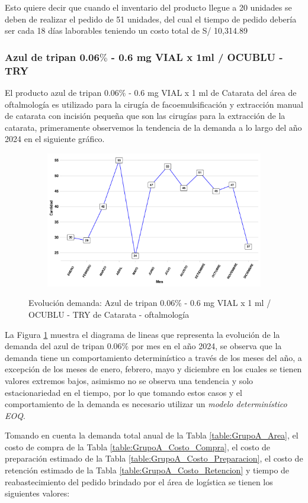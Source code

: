 Esto quiere decir que cuando el inventario del producto llegue a 20 unidades se deben de realizar el pedido de 51 unidades, del cual el tiempo de pedido debería ser cada 18 días laborables teniendo un costo total de S/ 10,314.89
\subsubsection{Azul de tripan 0.06$\%$ - 0.6 mg VIAL x 1ml / OCUBLU - TRY}

El producto azul de tripan 0.06$\%$ - 0.6 mg VIAL x 1 ml de Catarata del área de oftalmología es utilizado para la cirugía de facoemulsificación y extracción manual de catarata con incisión pequeña que son las cirugías para la extracción de la catarata, primeramente observemos la tendencia de la demanda a lo largo del año 2024 en el siguiente gráfico.

\begin{figure}[H]
  \caption{Evolución demanda: Azul de tripan 0.06$\%$ - 0.6 mg VIAL x 1 ml / OCUBLU - TRY de Catarata - oftalmología}
  {\includegraphics[width=15cm, height=5.95cm]{images/PROD017_demanda.pdf}}
  \label{fig:PROD017_demanda}
\end{figure}

La Figura \ref{fig:PROD017_demanda} muestra el diagrama de lineas que representa la evolución de la demanda del azul de tripan 0.06$\%$ por mes en el año 2024, se observa que la demanda tiene un comportamiento determinístico a través de los meses del año, a excepción de los meses de enero, febrero, mayo y diciembre en los cuales se tienen valores extremos bajos, asimismo no se observa una tendencia y solo estacionariedad en el tiempo, por lo que tomando estos casos y el comportamiento de la demanda es necesario utilizar un \textsl{modelo determinístico EOQ}.

Tomando en cuenta la demanda total anual de la Tabla \ref{table:GrupoA_Area}, el costo de compra de la Tabla \ref{table:GrupoA_Costo_Compra}, el costo de preparación estimado de la Tabla \ref{table:GrupoA_Costo_Preparacion}, el costo de retención estimado de la Tabla \ref{table:GrupoA_Costo_Retencion} y tiempo de reabastecimiento del pedido brindado por el área de logística se tienen los siguientes valores:

